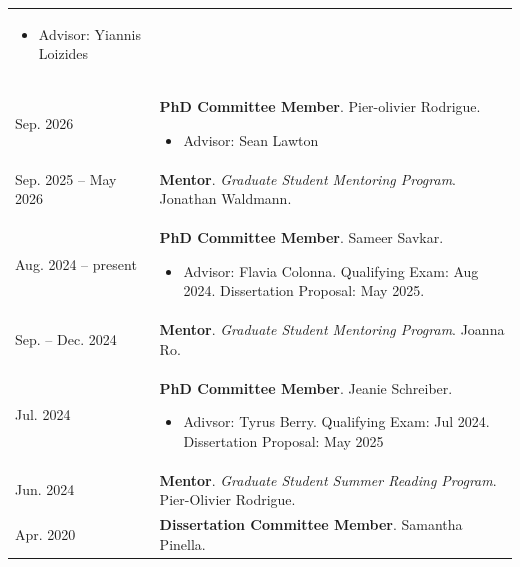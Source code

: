\begin{center}
{\begin{longtable}{p{}  p{}}
        {\small
        \begin{itemize}
        \setlength{\parindent}{0em}
        \item[] Advisor: Yiannis Loizides
        \end{itemize}
        }
        \vspace{-1em}
         \\ 
 Sep.  2026 & \textbf{PhD Committee Member}.  Pier-olivier Rodrigue. 
        \hspace{-1em}

        {\small
        \begin{itemize}
        \setlength{\parindent}{0em}
        \item[] Advisor: Sean Lawton
        \end{itemize}
        }
        \vspace{-1em}
         \\ 
 Sep.  2025 --  May  2026 & \textbf{Mentor}. \textit{Graduate Student Mentoring Program}.  Jonathan Waldmann.  \\ 
 Aug.  2024 --    present & \textbf{PhD Committee Member}.  Sameer Savkar. 
        \hspace{-1em}

        {\small
        \begin{itemize}
        \setlength{\parindent}{0em}
        \item[] Advisor: Flavia Colonna. Qualifying Exam: Aug 2024. Dissertation Proposal: May 2025.
        \end{itemize}
        }
        \vspace{-1em}
         \\ 
 Sep.  --  Dec.  2024 & \textbf{Mentor}. \textit{Graduate Student Mentoring Program}.  Joanna Ro.  \\ 
 Jul.  2024 & \textbf{PhD Committee Member}.  Jeanie Schreiber. 
        \hspace{-1em}

        {\small
        \begin{itemize}
        \setlength{\parindent}{0em}
        \item[] Adivsor: Tyrus Berry. Qualifying Exam: Jul 2024. Dissertation Proposal: May 2025
        \end{itemize}
        }
        \vspace{-1em}
         \\ 
 Jun.  2024 & \textbf{Mentor}. \textit{Graduate Student Summer Reading Program}.  Pier-Olivier Rodrigue.  \\ 
 Apr.  2020 & \textbf{Dissertation Committee Member}.  Samantha Pinella. 
        \hspace{-1em}


\end{longtable}}
\end{center}
